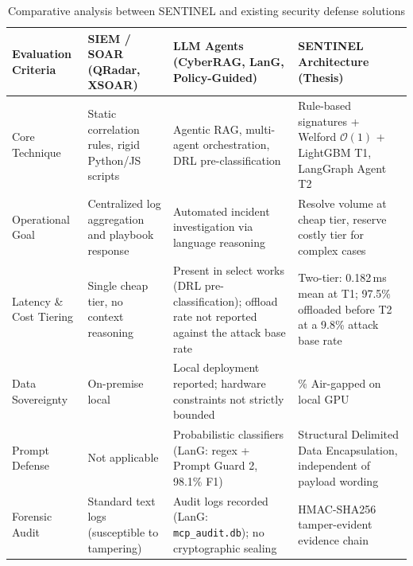 \begin{table}[htbp]
\centering
\caption[Comparative analysis with existing defense solutions]{Comparative analysis between SENTINEL and existing security defense solutions}
\label{tab:related_work_comparison}
\footnotesize
\setlength{\tabcolsep}{4pt}
\begin{tabularx}{\textwidth}{>{\raggedright\arraybackslash}p{2.6cm} >{\raggedright\arraybackslash}X >{\raggedright\arraybackslash}X >{\raggedright\arraybackslash}X}
\toprule
\textbf{Evaluation Criteria} & \textbf{SIEM / SOAR (QRadar, XSOAR)} & \textbf{LLM Agents (CyberRAG, LanG, Policy-Guided)} & \textbf{SENTINEL Architecture (Thesis)} \\
\midrule
Core Technique & Static correlation rules, rigid Python/JS scripts & Agentic RAG, multi-agent orchestration, DRL pre-classification & Rule-based signatures + Welford $\mathcal{O}(1)$ + LightGBM T1, LangGraph Agent T2 \\
Operational Goal & Centralized log aggregation and playbook response & Automated incident investigation via language reasoning & Resolve volume at cheap tier, reserve costly tier for complex cases \\
Latency \& Cost Tiering & Single cheap tier, no context reasoning & Present in select works (DRL pre-classification); offload rate not reported against the attack base rate & Two-tier: 0.182\,ms mean at T1; 97.5\% offloaded before T2 at a 9.8\% attack base rate \\
Data Sovereignty & On-premise local & Local deployment reported; hardware constraints not strictly bounded & 100\% Air-gapped on local GPU \\
Prompt Defense & Not applicable & Probabilistic classifiers (LanG: regex + Prompt Guard 2, 98.1\% F1) & Structural Delimited Data Encapsulation, independent of payload wording \\
Forensic Audit & Standard text logs (susceptible to tampering) & Audit logs recorded (LanG: \texttt{mcp\_audit.db}); no cryptographic sealing & HMAC-SHA256 tamper-evident evidence chain \\
\bottomrule
\end{tabularx}
\end{table}
